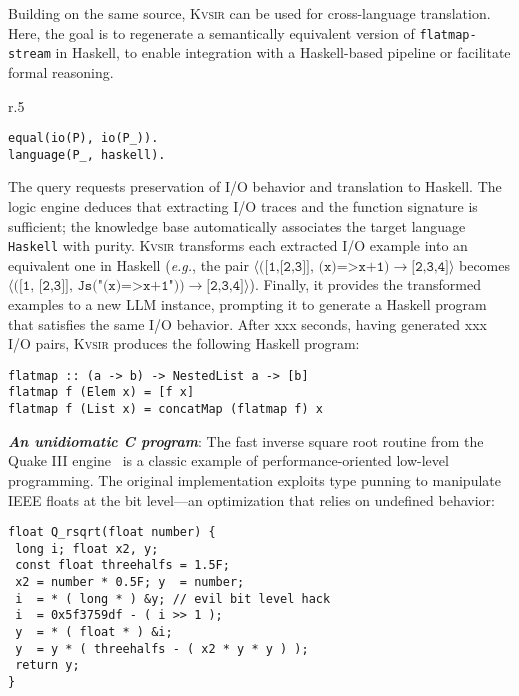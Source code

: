 \documentclass[sigplan]{acmart}
\def\eg{{\em e.g.}, }
\newcommand{\sys}{{\scshape Kv{\textalpha}sir}\xspace}
\newcommand{\heading}[1]{\vspace{2pt}\noindent\textbf{\emph{#1}}:\enspace}
\newcommand{\xxx}{\colorbox{red!30}{xxx}\xspace}
\begin{document}
Building on the same source, \sys can be used for cross-language
translation. 
Here, the goal is to regenerate a semantically equivalent version
of \texttt{flatmap-stream} in Haskell, to enable integration with a
Haskell-based pipeline or facilitate formal reasoning.

\begin{wrapfigure}[3]{r}{.5\columnwidth}
\vspace{-10pt}
\begin{verbatim}
equal(io(P), io(P_)).
language(P_, haskell).
\end{verbatim}
\end{wrapfigure}
The query requests preservation of I/O behavior and translation to Haskell. The
logic engine deduces that extracting I/O traces and the function signature is
sufficient; the knowledge base automatically associates the target language
\texttt{Haskell} with purity.
\sys transforms each extracted I/O example into an equivalent one in Haskell (\eg 
the pair $\langle\texttt{([1,[2,3]], (x)=>x+1)}\to\texttt{[2,3,4]}\rangle$ 
becomes $\langle(\texttt{[1, [2,3]], Js("(x)=>x+1"))}\to\texttt{[2,3,4]}\rangle$).
Finally, it provides the transformed examples to a new LLM instance, prompting it
to generate a Haskell program that satisfies the same I/O behavior.
After \xxx seconds, having generated \xxx I/O pairs, \sys produces the following
Haskell program:
\begin{verbatim}
flatmap :: (a -> b) -> NestedList a -> [b]
flatmap f (Elem x) = [f x]
flatmap f (List x) = concatMap (flatmap f) x
\end{verbatim}

\heading{An unidiomatic C program}
The fast inverse square root routine from the Quake III
engine~\cite{fast_inv_sqrt}
is a classic example of performance-oriented low-level programming.
The original implementation exploits type punning to manipulate IEEE
floats at the bit level---an optimization that relies on undefined behavior:

\begin{verbatim}
float Q_rsqrt(float number) {
 long i; float x2, y;
 const float threehalfs = 1.5F;
 x2 = number * 0.5F; y  = number;
 i  = * ( long * ) &y; // evil bit level hack
 i  = 0x5f3759df - ( i >> 1 );
 y  = * ( float * ) &i;
 y  = y * ( threehalfs - ( x2 * y * y ) );
 return y;
}
\end{verbatim}
\end{document}
